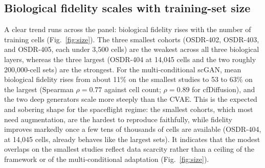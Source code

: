 \documentclass[11pt]{article}
\begin{document}
\subsection{Biological fidelity scales with training-set size}
A clear trend runs across the panel: biological fidelity rises with the number of training cells (Fig.~\ref{fig:size}). The three smallest cohorts (OSDR-402, OSDR-403, and OSDR-405, each under 3{,}500 cells) are the weakest across all three biological layers, whereas the three largest (OSDR-404 at 14{,}045 cells and the two roughly 200{,}000-cell sets) are the strongest. For the multi-conditional scGAN, mean biological fidelity rises from about 11\% on the smallest studies to 53 to 63\% on the largest (Spearman $\rho=0.77$ against cell count; $\rho=0.89$ for cfDiffusion), and the two deep generators scale more steeply than the CVAE. This is the expected and sobering shape for the spaceflight regime: the smallest cohorts, which most need augmentation, are the hardest to reproduce faithfully, while fidelity improves markedly once a few tens of thousands of cells are available (OSDR-404, at 14{,}045 cells, already behaves like the largest sets). It indicates that the modest overlaps on the smallest studies reflect data scarcity rather than a ceiling of the framework or of the multi-conditional adaptation (Fig.~\ref{fig:size}).

\begin{table}[t]
\centering
\caption{\textbf{Dataset panel.} Five spaceflight configurations drawn from NASA OSDR, evaluated as individual Rodent Research Reference Mission-2 (RRRM-2) studies and as one pooled brain cohort, together with one out-of-domain cancer control. All spaceflight datasets contrast spaceflight versus ground control; the cancer control contrasts metastatic-site tumor versus adjacent normal tissue. Cell counts are the processed, HVG-selected matrices used for generation and evaluation.}
\label{tab:data}
\small
{}
\end{table}
\end{document}
